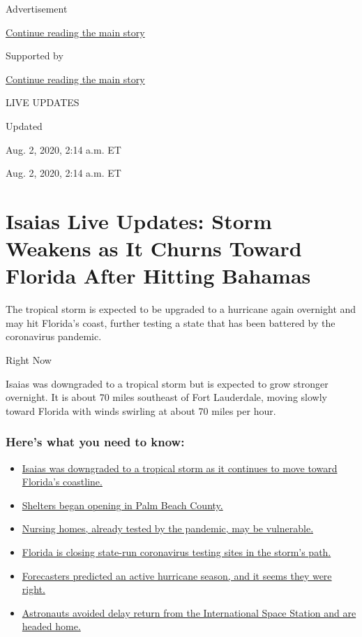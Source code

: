 Advertisement

\protect\hyperlink{after-top}{Continue reading the main story}

Supported by

\protect\hyperlink{after-sponsor}{Continue reading the main story}

LIVE UPDATES

Updated~

Aug. 2, 2020, 2:14 a.m. ET

Aug. 2, 2020, 2:14 a.m. ET

\hypertarget{isaias-live-updates-storm-weakens-as-it-churns-toward-florida-after-hitting-bahamas}{%
\section{Isaias Live Updates: Storm Weakens as It Churns Toward Florida
After Hitting
Bahamas}\label{isaias-live-updates-storm-weakens-as-it-churns-toward-florida-after-hitting-bahamas}}

The tropical storm is expected to be upgraded to a hurricane again
overnight and may hit Florida's coast, further testing a state that has
been battered by the coronavirus pandemic.

Right Now

Isaias was downgraded to a tropical storm but is expected to grow
stronger overnight. It is about 70 miles southeast of Fort Lauderdale,
moving slowly toward Florida with winds swirling at about 70 miles per
hour.

\hypertarget{heres-what-you-need-to-know}{%
\subsubsection{Here's what you need to
know:}\label{heres-what-you-need-to-know}}

\begin{itemize}
\tightlist
\item
  \protect\hyperlink{link-1ab916c}{Isaias was downgraded to a tropical
  storm as it continues to move toward Florida's coastline.}
\item
  \protect\hyperlink{link-45d987d2}{Shelters began opening in Palm Beach
  County.}
\item
  \protect\hyperlink{link-1257f12e}{Nursing homes, already tested by the
  pandemic, may be vulnerable.}
\item
  \protect\hyperlink{link-65b0758c}{Florida is closing state-run
  coronavirus testing sites in the storm's path.}
\item
  \protect\hyperlink{link-41916cd2}{Forecasters predicted an active
  hurricane season, and it seems they were right.}
\item
  \protect\hyperlink{link-5019ef0e}{Astronauts avoided delay return from
  the International Space Station and are headed home.}
\end{itemize}

